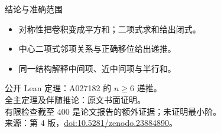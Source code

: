 \documentclass{beamer}
\begin{document}
\begin{frame}{结论与准确范围}
\begin{itemize}
\item 对称性把卷积变成平方和；二项式求和给出闭式。
\item 中心二项式邻项关系与正确移位给出递推。
\item 同一结构解释中间项、近中间项与半行和。
\end{itemize}
\small
公开 Lean 定理：A027182 的 $n\ge6$ 递推。\\
全主定理及伴随推论：原文书面证明。\\
有限检查截至 $400$ 是论文报告的额外证据；未证明最小阶。\\
来源：第 4 版，\href{https://doi.org/10.5281/zenodo.23884890}{doi:10.5281/zenodo.23884890}。
\end{frame}
\appendix
\end{document}

